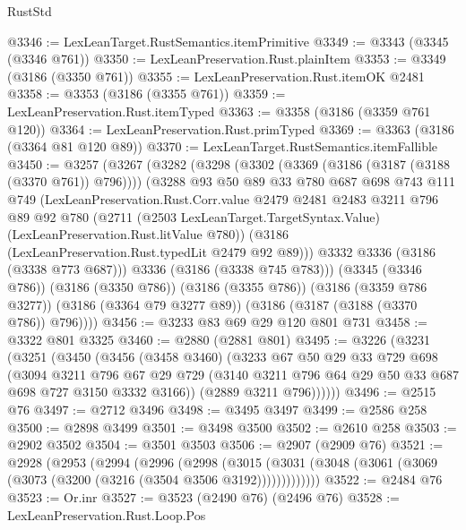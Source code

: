 \begin{lexlean}{RustStd}
\begin{coremodule}
@3346 := LexLeanTarget.RustSemantics.itemPrimitive
@3349 := @3343 (@3345 (@3346 @761))
@3350 := LexLeanPreservation.Rust.plainItem
@3353 := @3349 (@3186 (@3350 @761))
@3355 := LexLeanPreservation.Rust.itemOK @2481
@3358 := @3353 (@3186 (@3355 @761))
@3359 := LexLeanPreservation.Rust.itemTyped
@3363 := @3358 (@3186 (@3359 @761 @120))
@3364 := LexLeanPreservation.Rust.primTyped
@3369 := @3363 (@3186 (@3364 @81 @120 @89))
@3370 := LexLeanTarget.RustSemantics.itemFallible
@3450 := @3257
    (@3267
      (@3282
        (@3298
          (@3302 (@3369 (@3186 (@3187 (@3188 (@3370 @761)) @796))))
          (@3288
            @93
            @50
            @89
            @33
            @780
            @687
            @698
            @743
            @111
            @749
            (LexLeanPreservation.Rust.Corr.value
              @2479
              @2481
              @2483
              @3211
              @796
              @89
              @92
              @780
              (@2711
                (@2503 LexLeanTarget.TargetSyntax.Value)
                (LexLeanPreservation.Rust.litValue @780))
              (@3186 (LexLeanPreservation.Rust.typedLit @2479 @92 @89)))
            @3332
            @3336
            (@3186 (@3338 @773 @687)))
          @3336
          (@3186 (@3338 @745 @783)))
        (@3345 (@3346 @786))
        (@3186 (@3350 @786))
        (@3186 (@3355 @786))
        (@3186 (@3359 @786 @3277))
        (@3186 (@3364 @79 @3277 @89))
        (@3186 (@3187 (@3188 (@3370 @786)) @796))))
@3456 := @3233 @83 @69 @29 @120 @801 @731
@3458 := @3322 @801 @3325
@3460 := @2880 (@2881 @801)
@3495 := @3226
    (@3231
      (@3251
        (@3450
          (@3456
            (@3458 @3460)
            (@3233
              @67
              @50
              @29
              @33
              @729
              @698
              (@3094
                @3211
                @796
                @67
                @29
                @729
                (@3140 @3211 @796 @64 @29 @50 @33 @687 @698 @727 @3150 @3332 @3166))
              (@2889 @3211 @796))))))
@3496 := @2515 @76
@3497 := @2712 @3496
@3498 := @3495 @3497
@3499 := @2586 @258
@3500 := @2898 @3499
@3501 := @3498 @3500
@3502 := @2610 @258
@3503 := @2902 @3502
@3504 := @3501 @3503
@3506 := @2907 (@2909 @76)
@3521 := @2928
    (@2953
      (@2994
        (@2996
          (@2998
            (@3015 (@3031 (@3048 (@3061 (@3069 (@3073 (@3200 (@3216 (@3504 @3506 @3192)))))))))))))
@3522 := @2484 @76
@3523 := Or.inr
@3527 := @3523 (@2490 @76) (@2496 @76)
@3528 := LexLeanPreservation.Rust.Loop.Pos

\end{coremodule}
\end{lexlean}
